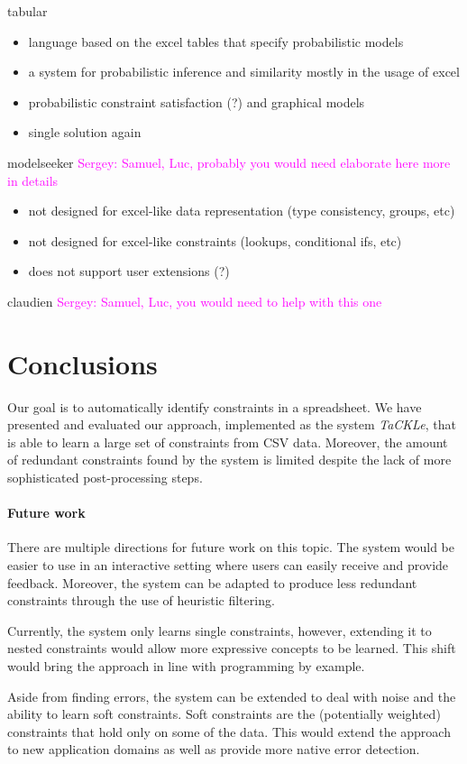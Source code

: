 \documentclass{sig-alternate-05-2015}
\newcommand{\sergey}[1]{\textcolor{magenta}{{\sc Sergey:} #1}\xspace}
\newcommand{\format}[1]{\textit{#1}\xspace}
\newcommand{\sname}{\format{TaCKLe}}
\begin{document}
tabular \cite{tabular}
\begin{itemize}
  \item language based on the excel tables that specify probabilistic models
  \item a system for probabilistic inference and similarity mostly in the usage of excel
  \item probabilistic constraint satisfaction (?) and graphical models
  \item single solution again
\end{itemize}

modelseeker \cite{modelseeker} \sergey{Samuel, Luc, probably you would need elaborate here more in details}

\begin{itemize}
  \item not designed for excel-like data representation (type consistency, groups, etc)
  \item not designed for excel-like constraints (lookups, conditional ifs, etc)
  \item does not support user extensions (?)
\end{itemize}

claudien \cite{claudien} \sergey{Samuel, Luc, you would need to help with this one}

\section{Conclusions}

Our goal is to automatically identify constraints in a spreadsheet.
We have presented and evaluated our approach, implemented as the system \sname, that is able to learn a large set of constraints from CSV data.
Moreover, the amount of redundant constraints found by the system is limited despite the lack of more sophisticated post-processing steps.

\paragraph{Future work}
There are multiple directions for future work on this topic.
The system would be easier to use in an interactive setting where users can easily receive and provide feedback.
Moreover, the system can be adapted to produce less redundant constraints through the use of heuristic filtering.

Currently, the system only learns single constraints, however, extending it to nested constraints would allow more expressive concepts to be learned.
This shift would bring the approach in line with programming by example.

Aside from finding errors, the system can be extended to deal with noise and the ability to learn soft constraints.
Soft constraints are the (potentially weighted) constraints that hold only on some of the data.
This would extend the approach to new application domains as well as provide more native error detection.



\end{document}
